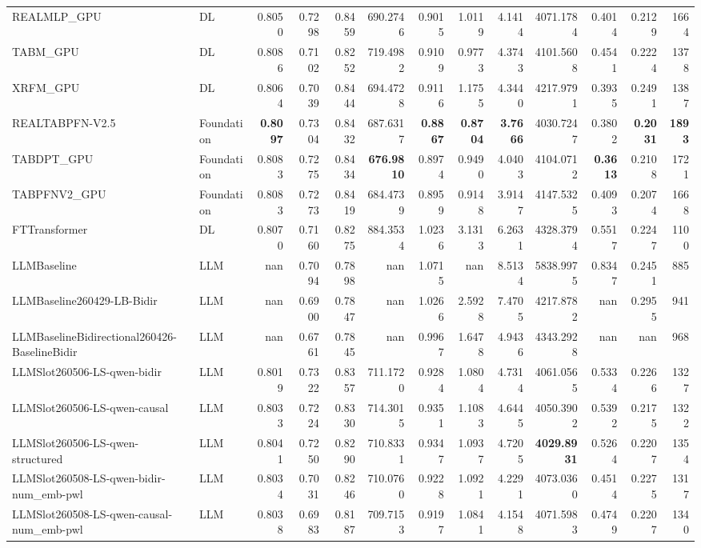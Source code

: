 \begin{table}[htbp]
{\begin{tabular}{ll|rrrrrrrrrr|r}
REALMLP\_GPU & DL & 0.8050 & 0.7298 & 0.8459 & 690.2746 & 0.9015 & 1.0119 & 4.1414 & 4071.1784 & 0.4014 & 0.2129 & 1664 \\
TABM\_GPU & DL & 0.8086 & 0.7102 & 0.8252 & 719.4982 & 0.9109 & 0.9773 & 4.3743 & 4101.5608 & 0.4541 & 0.2224 & 1378 \\
XRFM\_GPU & DL & 0.8064 & 0.7039 & 0.8444 & 694.4728 & 0.9116 & 1.1755 & 4.3440 & 4217.9791 & 0.3935 & 0.2491 & 1387 \\
REALTABPFN-V2.5 & Foundation & \textbf{0.8097} & 0.7304 & 0.8432 & 687.6317 & \textbf{0.8867} & \textbf{0.8704} & \textbf{3.7666} & 4030.7247 & 0.3802 & \textbf{0.2031} & \textbf{1893} \\
TABDPT\_GPU & Foundation & 0.8083 & 0.7275 & 0.8434 & \textbf{676.9810} & 0.8974 & 0.9490 & 4.0403 & 4104.0712 & \textbf{0.3613} & 0.2108 & 1721 \\
TABPFNV2\_GPU & Foundation & 0.8083 & 0.7273 & 0.8419 & 684.4739 & 0.8959 & 0.9148 & 3.9147 & 4147.5325 & 0.4093 & 0.2074 & 1668 \\
\midrule
FTTransformer & DL & 0.8070 & 0.7160 & 0.8275 & 884.3534 & 1.0236 & 3.1313 & 6.2631 & 4328.3794 & 0.5517 & 0.2247 & 1100 \\
LLMBaseline & LLM & nan & 0.7094 & 0.7898 & nan & 1.0715 & nan & 8.5134 & 5838.9975 & 0.8347 & 0.2451 & 885 \\
LLMBaseline260429-LB-Bidir & LLM & nan & 0.6900 & 0.7847 & nan & 1.0266 & 2.5928 & 7.4705 & 4217.8782 & nan & 0.2955 & 941 \\
LLMBaselineBidirectional260426-BaselineBidir & LLM & nan & 0.6761 & 0.7845 & nan & 0.9967 & 1.6478 & 4.9436 & 4343.2928 & nan & nan & 968 \\
LLMSlot260506-LS-qwen-bidir & LLM & 0.8019 & 0.7322 & 0.8357 & 711.1720 & 0.9284 & 1.0804 & 4.7314 & 4061.0565 & 0.5334 & 0.2266 & 1327 \\
LLMSlot260506-LS-qwen-causal & LLM & 0.8033 & 0.7224 & 0.8330 & 714.3015 & 0.9351 & 1.1083 & 4.6445 & 4050.3902 & 0.5392 & 0.2175 & 1322 \\
LLMSlot260506-LS-qwen-structured & LLM & 0.8041 & 0.7250 & 0.8290 & 710.8331 & 0.9347 & 1.0937 & 4.7205 & \textbf{4029.8931} & 0.5264 & 0.2207 & 1354 \\
LLMSlot260508-LS-qwen-bidir-num\_emb-pwl & LLM & 0.8034 & 0.7031 & 0.8246 & 710.0760 & 0.9228 & 1.0921 & 4.2291 & 4073.0360 & 0.4514 & 0.2275 & 1317 \\
LLMSlot260508-LS-qwen-causal-num\_emb-pwl & LLM & 0.8038 & 0.6983 & 0.8187 & 709.7153 & 0.9197 & 1.0841 & 4.1548 & 4071.5983 & 0.4749 & 0.2207 & 1340 \\

\end{tabular}}
\end{table}
